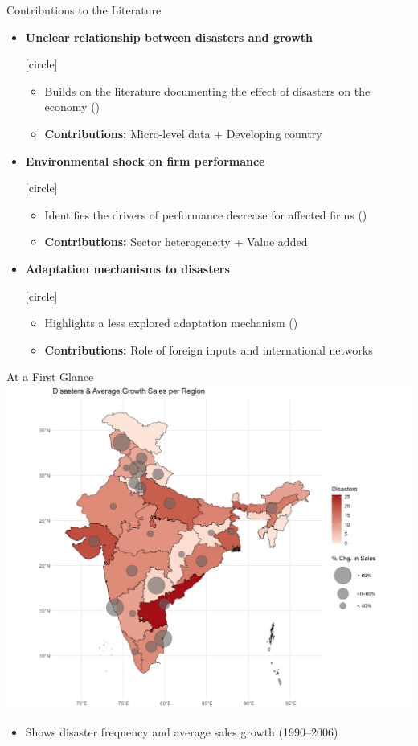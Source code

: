 \documentclass[
  xcolor=svgnames,
  bookmarks=true,
  bookmarksopen=true,
  pdfborder={0 0 0},
  pdfhighlight={/N},
  linkbordercolor={rgb}{0.5,0.5,0.5},
  implicit=false,
  colorlinks=true,
  allcolors=deepblue
]{beamer}
\begin{document}
\begin{frame}{Contributions to the Literature}
\begin{itemize}
    \item \textbf{Unclear relationship between disasters and growth}
    {[circle]
    \begin{itemize}
        \item Builds on the literature documenting the effect of disasters on the economy ({\footnotesize\cite{RothTran2025, Okubo2021, Collati2024, friedt2022}})
        \item \textbf{Contributions:} Micro-level data + Developing country
    \end{itemize}
    }

\vspace{0.3cm}
    \item \textbf{Environmental shock on firm performance}
    {[circle]
    \begin{itemize}
        \item Identifies the drivers of performance decrease for affected firms ({\footnotesize\cite{Bas2025, Nedoncelle2024, Barrot2016}})
        \item \textbf{Contributions:} Sector heterogeneity + Value added
    \end{itemize}
    }

\vspace{0.3cm}
    \item \textbf{Adaptation mechanisms to disasters}
    {[circle]
    \begin{itemize}
        \item Highlights a less explored adaptation mechanism ({\footnotesize\cite{Henriet2012, Nedoncelle2024, Hsu2018}})
        \item \textbf{Contributions:} Role of foreign inputs and international networks
    \end{itemize}
    }
\end{itemize}
\end{frame}


\begin{frame}{At a First Glance}
\centering
\includegraphics[height=7 cm]{Map disasters.png}
\begin{itemize}
    \item Shows disaster frequency and average sales growth (1990--2006)
\end{itemize}
\end{frame}
\end{document}
